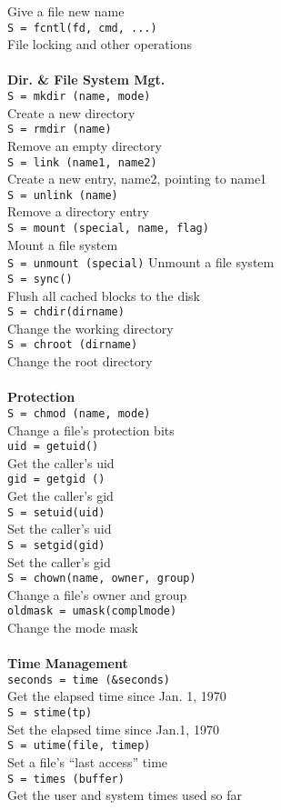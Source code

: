 \documentclass{book}
\newcommand {\kw}  [1] {\textbf{#1}}
\newcommand {\cmd} [1] {\texttt{#1}}
\begin{document}
Give a file new name
\\
\cmd{S = fcntl(fd, cmd, ...)}\\
File locking and other operations
\\
\\
\kw{Dir. \& File System Mgt.}\\
\cmd{S = mkdir (name, mode)}\\
Create a new directory
\\
\cmd{S = rmdir (name)}\\
Remove an empty directory
\\
\cmd{S = link (name1, name2)}\\
Create a new entry, name2, pointing to name1
\\
\cmd{S = unlink (name)}\\
Remove a directory entry
\\
\cmd{S = mount (special, name, flag)}\\
Mount a file system
\\
\cmd{S = unmount (special)}
Unmount a file system
\\
\cmd{S = sync()}\\
Flush all cached blocks to the disk
\\
\cmd{S = chdir(dirname)}\\
Change the working directory
\\
\cmd{S = chroot (dirname)}\\
Change the root directory
\\
\\
\kw{Protection}\\
\cmd{S = chmod (name, mode)}\\
Change a file's protection bits
\\
\cmd{uid = getuid()}\\
Get the caller's uid
\\
\cmd{gid = getgid ()}\\
Get the caller's gid
\\
\cmd{S = setuid(uid)}\\
Set the caller's uid
\\
\cmd{S = setgid(gid)}\\
Set the caller's gid
\\
\cmd{S = chown(name, owner, group)}\\
Change a file's owner and group
\\
\cmd{oldmask = umask(complmode)}\\
Change the mode mask
\\
\\
\kw{Time Management}\\
\cmd{seconds = time (\&seconds)}\\
Get the elapsed time since Jan. 1, 1970
\\
\cmd{S = stime(tp)}\\
Set the elapsed time since Jan.1, 1970
\\
\cmd{S = utime(file, timep)}\\
Set a file's ``last access'' time
\\
\cmd{S = times (buffer)}\\
Get the user and system times used so far
\\
\end{document}
